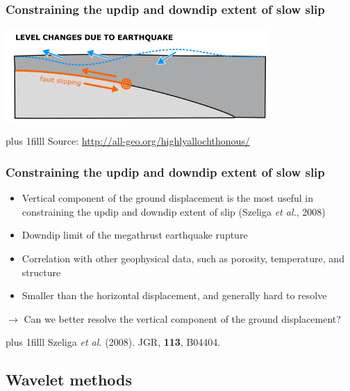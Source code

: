\documentclass{beamer}
\newcommand{\btVFill}{\vskip0pt plus 1filll}
\begin{document}
	\begin{frame}
		\frametitle{Constraining the updip and downdip extent of slow slip}

		\vspace{2em}

		\begin{center}
			\includegraphics[trim={0cm 0cm 0cm 0cm}, clip, width=10cm]{slowslip/Postquake_level_changes_shallow_thrust.png}
		\end{center}
		\btVFill
		\tiny{Source: \href{http://all-geo.org/highlyallochthonous/}{http://all-geo.org/highlyallochthonous/}}	
	\end{frame}

	\begin{frame}
		\frametitle{Constraining the updip and downdip extent of slow slip}
		\begin{itemize}
			\item Vertical component of the ground displacement is the most useful in constraining the updip and downdip extent of slip (Szeliga \textit{et al.}, 2008)
			\item Downdip limit of the megathrust earthquake rupture
			\item Correlation with other geophysical data, such as porosity, temperature, and structure
			\item Smaller than the horizontal displacement, and generally hard to resolve
		\end{itemize}
		\begin{block}{}
			$\rightarrow$ Can we better resolve the vertical component of the ground displacement?
		\end{block}
		\btVFill
\tiny{Szeliga \textit{et al.} (2008). JGR, \textbf{113}, B04404.}
	\end{frame}


	\subsection{Wavelet methods}
\end{document}
